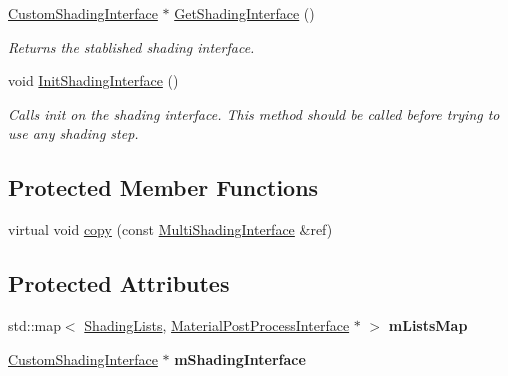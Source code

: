 \begin{DoxyCompactItemize}
\mbox{\hyperlink{class_geometry_engine_1_1_custom_shading_1_1_custom_shading_interface}{Custom\+Shading\+Interface}} $\ast$ \mbox{\hyperlink{class_geometry_engine_1_1_custom_shading_1_1_multi_shading_interface_a21461546d936b94641926f0a1ed73557}{Get\+Shading\+Interface}} ()
\begin{DoxyCompactList}\small\item\em Returns the stablished shading interface. \end{DoxyCompactList}\item 
\mbox{\label{class_geometry_engine_1_1_custom_shading_1_1_multi_shading_interface_a02c2c4218c5f38fb4b41f3defa4ee71c}} 
void \mbox{\hyperlink{class_geometry_engine_1_1_custom_shading_1_1_multi_shading_interface_a02c2c4218c5f38fb4b41f3defa4ee71c}{Init\+Shading\+Interface}} ()
\begin{DoxyCompactList}\small\item\em Calls init on the shading interface. This method should be called before trying to use any shading step. \end{DoxyCompactList}\end{DoxyCompactItemize}
\subsection*{Protected Member Functions}
\begin{DoxyCompactItemize}
\item 
virtual void \mbox{\hyperlink{class_geometry_engine_1_1_custom_shading_1_1_multi_shading_interface_aa2346483f10349ed95ff036013cc866b}{copy}} (const \mbox{\hyperlink{class_geometry_engine_1_1_custom_shading_1_1_multi_shading_interface}{Multi\+Shading\+Interface}} \&ref)
\end{DoxyCompactItemize}
\subsection*{Protected Attributes}
\begin{DoxyCompactItemize}
\item 
\mbox{\label{class_geometry_engine_1_1_custom_shading_1_1_multi_shading_interface_a2b96814185e200e1e55b678fdadfa179}} 
std\+::map$<$ \mbox{\hyperlink{namespace_geometry_engine_1_1_custom_shading_a9bfcbfb6d734e4d6fb8e2c661b987db6}{Shading\+Lists}}, \mbox{\hyperlink{class_geometry_engine_1_1_custom_shading_1_1_material_post_process_interface}{Material\+Post\+Process\+Interface}} $\ast$ $>$ {\bfseries m\+Lists\+Map}
\item 
\mbox{\label{class_geometry_engine_1_1_custom_shading_1_1_multi_shading_interface_a7db9625fc2f308016121f99252bb7654}} 
\mbox{\hyperlink{class_geometry_engine_1_1_custom_shading_1_1_custom_shading_interface}{Custom\+Shading\+Interface}} $\ast$ {\bfseries m\+Shading\+Interface}
\end{DoxyCompactItemize}


